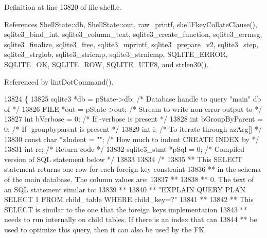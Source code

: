 Definition at line 13820 of file shell.\+c.



References Shell\+State\+::db, Shell\+State\+::out, raw\+\_\+printf, shell\+Fkey\+Collate\+Clause(), sqlite3\+\_\+bind\+\_\+int, sqlite3\+\_\+column\+\_\+text, sqlite3\+\_\+create\+\_\+function, sqlite3\+\_\+errmsg, sqlite3\+\_\+finalize, sqlite3\+\_\+free, sqlite3\+\_\+mprintf, sqlite3\+\_\+prepare\+\_\+v2, sqlite3\+\_\+step, sqlite3\+\_\+strglob, sqlite3\+\_\+stricmp, sqlite3\+\_\+strnicmp, S\+Q\+L\+I\+T\+E\+\_\+\+E\+R\+R\+OR, S\+Q\+L\+I\+T\+E\+\_\+\+OK, S\+Q\+L\+I\+T\+E\+\_\+\+R\+OW, S\+Q\+L\+I\+T\+E\+\_\+\+U\+T\+F8, and strlen30().



Referenced by lint\+Dot\+Command().


\begin{DoxyCode}
13824  \{
13825   sqlite3 *db = pState->db;       \textcolor{comment}{/* Database handle to query "main" db of */}
13826   FILE *out = pState->out;        \textcolor{comment}{/* Stream to write non-error output to */}
13827   \textcolor{keywordtype}{int} bVerbose = 0;               \textcolor{comment}{/* If -verbose is present */}
13828   \textcolor{keywordtype}{int} bGroupByParent = 0;         \textcolor{comment}{/* If -groupbyparent is present */}
13829   \textcolor{keywordtype}{int} i;                          \textcolor{comment}{/* To iterate through azArg[] */}
13830   \textcolor{keyword}{const} \textcolor{keywordtype}{char} *zIndent = \textcolor{stringliteral}{""};       \textcolor{comment}{/* How much to indent CREATE INDEX by */}
13831   \textcolor{keywordtype}{int} rc;                         \textcolor{comment}{/* Return code */}
13832   sqlite3_stmt *pSql = 0;         \textcolor{comment}{/* Compiled version of SQL statement below */}
13833 
13834   \textcolor{comment}{/*}
13835 \textcolor{comment}{  ** This SELECT statement returns one row for each foreign key constraint}
13836 \textcolor{comment}{  ** in the schema of the main database. The column values are:}
13837 \textcolor{comment}{  **}
13838 \textcolor{comment}{  ** 0. The text of an SQL statement similar to:}
13839 \textcolor{comment}{  **}
13840 \textcolor{comment}{  **      "EXPLAIN QUERY PLAN SELECT 1 FROM child\_table WHERE child\_key=?"}
13841 \textcolor{comment}{  **}
13842 \textcolor{comment}{  **    This SELECT is similar to the one that the foreign keys implementation}
13843 \textcolor{comment}{  **    needs to run internally on child tables. If there is an index that can}
13844 \textcolor{comment}{  **    be used to optimize this query, then it can also be used by the FK}

\end{DoxyCode}

